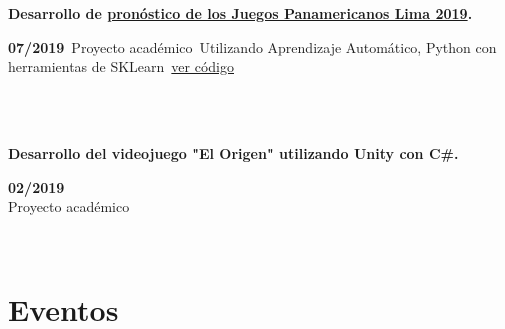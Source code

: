 \documentclass{article}
\begin{document}
    \begin{minipage}{0.8\textwidth}
    \parbox{0.8\linewidth}{\textbf{Desarrollo de \hyperref[sec:panamerican]{pronóstico de los Juegos Panamericanos Lima 2019}.}} \hfill \textbf{07/2019}\
    Proyecto académico\
    Utilizando Aprendizaje Automático, Python con herramientas de SKLearn\
    \href{https://github.com/JavierOramas/PanamericanPredictor}{ver código}\
\end{minipage} \hfill {}\\\\
\begin{minipage}{0.8\textwidth}
\parbox{0.8\linewidth}{\textbf{Desarrollo del videojuego "El Origen" utilizando Unity con C\#.}} \hfill \textbf{02/2019}\\
Proyecto académico\\
\end{minipage} \\
\section*{Eventos}
\end{document}
